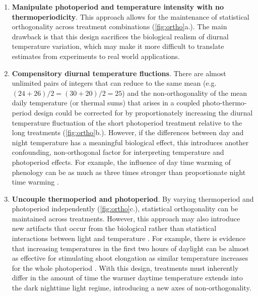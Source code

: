 \documentclass[11pt]{article}
\begin{document}
\begin{enumerate}
\item \textbf{Manipulate photoperiod and temperature intensity with no thermoperiodicity}. This approach allows for the maintenance of statistical orthogonality across treatment combinations (\ref{fig:ortho}a.). The main drawback is that this design sacrifices the biological realism of diurnal temperature variation, which may make it more difficult to translate estimates from experiments to real world applications.

\item \textbf{Compensitory diurnal temperature fluctions}. There are almost unlimited pairs of integers that can reduce to the same mean (e.g. $(24+26)/2 = (30+20)/2 = 25$) and the non-orthogonality of the mean daily temperature (or thermal sums) that arises in a coupled photo-thermo- period design could be corrected for by proportionately increasing the diurnal temperature fluctuation of the short photoperiod treatment relative to the long treatments (\ref{fig:ortho}b.). However, if the differences between day and night temperature has a meaningful biological effect, this introduces another confounding, non-orthogonal factor for interpreting temperature and photoperiod effects. For example, the influence of day time warming of phenology can be as much as three times stronger than proportionate night time warming \citep{Rossi2017,Meng:2020ui}.

\item \textbf{Uncouple thermoperiod and photoperiod}. By varying thermoperiod and photoperiod independently (\ref{fig:ortho}c.), statistical orthogonality can be maintained across treatments. However, this approach may also introduce new artifacts that occur from the biological rather than statistical interactions between light and temperature \citep{Chew:2012wj}. For example, there is evidence that increasing temperatures in the first two hours of daylight can be almost as effective for stimulating shoot elongation as similar temperature increases for the whole photoperiod \citep{Erwin1998}. With this design, treatments must inherently differ in the amount of time the warmer daytime temperature extends into the dark nighttime light regime, introducing a new axes of non-orthogonality.
\end{enumerate}
\end{document}
